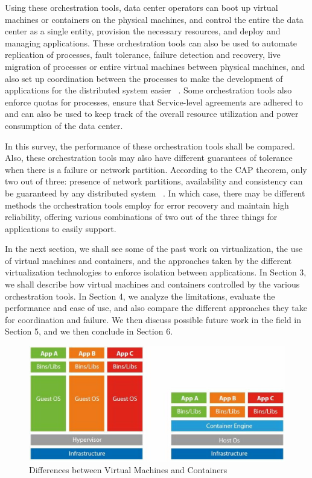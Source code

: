 \documentclass[10pt,twocolumn]{article}
\begin{document}
Using these orchestration tools, data center operators can boot up virtual machines or containers on the physical machines, and control the entire the data center as a single entity, provision the necessary resources, and deploy and managing applications.
These orchestration tools can also be used to automate replication of processes, fault tolerance, failure detection and recovery, live migration of processes or entire virtual machines between physical machines, and also set up coordination between the processes to make the development of applications for the distributed system easier ~\cite{live_migration, xen}.
Some orchestration tools also enforce quotas for processes, ensure that Service-level agreements are adhered to and can also be used to keep track of the overall resource utilization and power consumption of the data center.

In this survey, the performance of these orchestration tools shall be compared.
Also, these orchestration tools may also have different guarantees of tolerance when there is a failure or network partition.
According to the CAP theorem, only two out of three: presence of network partitions, availability and consistency can be guaranteed by any distributed system ~\cite{CAP_theorem}.
In which case, there may be different methods the orchestration tools employ for error recovery and maintain high reliability, offering various combinations of two out of the three things for applications to easily support.

In the next section, we shall see some of the past work on virtualization, the use of virtual machines and containers, and the approaches taken by the different virtualization technologies to enforce isolation between applications.
In Section 3, we shall describe how virtual machines and containers controlled by the various orchestration tools.
In Section 4, we analyze the limitations, evaluate the performance and ease of use, and also compare the different approaches they take for coordination and failure.
We then discuss possible future work in the field in Section 5, and we then conclude in Section 6.

\begin{figure}
  \centering
    \includegraphics[width=\textwidth]{container_vm}
    \caption{Differences between Virtual Machines and Containers ~\cite{intro_containerisation}}
  \label{overflow}
\end{figure}
\end{document}
